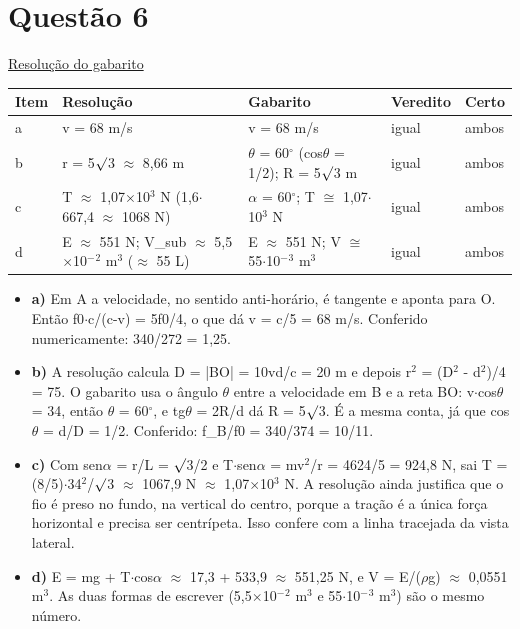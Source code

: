\documentclass{article}%
\begin{document}
\section*{Questão 6}%
\href{https://poliedroresolve.sistemapoliedro.com.br/vestibulares/ime/2027/ime-2-fase-dia-2-27-10-2026-2-fase-dia-2/dissertativa-6-fisica-2-fase-dia-2-ime-2027}{Resolução do gabarito}\par\smallskip%
\begin{longtable}{@{}p{} p{} p{} p{} p{}@{}}\toprule Item & Resolução & Gabarito & Veredito & Certo \\ \midrule
a & v = 68 m/s & v = 68 m/s & igual & ambos \\
b & r = 5$\surd$3 $\approx$ 8,66 m & $\theta$ = 60$^\circ$ (cos$\theta$ = 1/2); R = 5$\surd$3 m & igual & ambos \\
c & T $\approx$ 1,07$\times$10$^3$ N (1,6$\cdot$667,4 $\approx$ 1068 N) & $\alpha$ = 60$^\circ$; T $\cong$ 1,07$\cdot$10$^3$ N & igual & ambos \\
d & E $\approx$ 551 N; V\_sub $\approx$ 5,5$\times$10$^{-}$$^2$ m$^3$ ($\approx$ 55 L) & E $\approx$ 551 N; V $\cong$ 55$\cdot$10$^{-}$$^3$ m$^3$ & igual & ambos \\
\bottomrule\end{longtable}%
\begin{itemize}%
\item%
\textbf{a)} Em A a velocidade, no sentido anti{-}horário, é tangente e aponta para O. Então f0$\cdot$c/(c-v) = 5f0/4, o que dá v = c/5 = 68 m/s. Conferido numericamente: 340/272 = 1,25.%
\item%
\textbf{b)} A resolução calcula D = |BO| = 10vd/c = 20 m e depois r$^2$ = (D$^2$ - d$^2$)/4 = 75. O gabarito usa o ângulo $\theta$ entre a velocidade em B e a reta BO: v$\cdot$cos$\theta$ = 34, então $\theta$ = 60$^\circ$, e tg$\theta$ = 2R/d dá R = 5$\surd$3. É a mesma conta, já que cos$\theta$ = d/D = 1/2. Conferido: f\_B/f0 = 340/374 = 10/11.%
\item%
\textbf{c)} Com sen$\alpha$ = r/L = $\surd$3/2 e T$\cdot$sen$\alpha$ = mv$^2$/r = 4624/5 = 924,8 N, sai T = (8/5)$\cdot$34$^2$/$\surd$3 $\approx$ 1067,9 N $\approx$ 1,07$\times$10$^3$ N. A resolução ainda justifica que o fio é preso no fundo, na vertical do centro, porque a tração é a única força horizontal e precisa ser centrípeta. Isso confere com a linha tracejada da vista lateral.%
\item%
\textbf{d)} E = mg + T$\cdot$cos$\alpha$ $\approx$ 17,3 + 533,9 $\approx$ 551,25 N, e V = E/($\rho$g) $\approx$ 0,0551 m$^3$. As duas formas de escrever (5,5$\times$10$^{-}$$^2$ m$^3$ e 55$\cdot$10$^{-}$$^3$ m$^3$) são o mesmo número.%
\end{itemize}%
\end{document}
